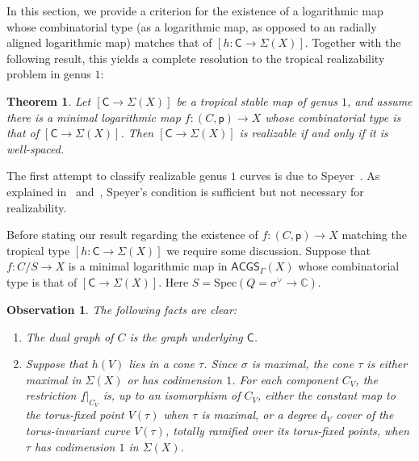 \documentclass{article}
\def\C{\mathbb{C}}
\newtheorem{theorem}[definition]{Theorem}
\newtheorem{observation}[definition]{Observation}
\begin{document}
In this section, we provide a criterion for the existence of a logarithmic map whose combinatorial type (as a logarithmic map, as opposed to an radially aligned logarithmic map) matches that of $[h \colon \mathsf{C} \to \Sigma(X)]$. Together with the following result, this yields a complete resolution to the tropical realizability problem in genus $1$: 

\begin{theorem}\cite[Theorem 4.4.8]{RSWII} \label{thm: rswii}
Let $[\mathsf{C} \to \Sigma(X)]$ be a tropical stable map of genus $1$, and assume there is a minimal logarithmic map $f:(C,\mathsf{p}) \to X$ whose combinatorial type is that of $[\mathsf{C} \to \Sigma(X)]$. Then $[\mathsf{C} \to \Sigma(X)]$ is realizable if and only if it is well-spaced.
\end{theorem}

The first attempt to classify realizable genus $1$ curves is due to Speyer~\cite{Speyer}. As explained in~\cite[Theorem~C]{Ran17} and~\cite[Figure~5]{RSWII}, Speyer’s condition is sufficient but not necessary for realizability.

Before stating our result regarding the existence of $f:(C,\mathsf{p}) \to X$ matching the tropical type $[h \colon \mathsf{C} \to \Sigma(X)]$ we require some discussion. Suppose that $f:C/S \to X$ is a minimal logarithmic map in $\mathsf{ACGS}_{\Gamma}(X)$ whose combinatorial type is that of $[\mathsf{C} \to \Sigma(X)]$. Here $S=\mathrm{Spec}( Q=\sigma^\vee \to \C)$.

\begin{observation}\label{disc:properties-over-sigma}
The following facts are clear:
\begin{enumerate}[label=(\arabic*)]
    \item The dual graph of $C$ is the graph underlying $\mathsf{C}$. 
    
    \item Suppose that $h(V)$ lies in a cone $\tau$. Since $\sigma$ is maximal, the cone $\tau$ is either maximal in $\Sigma(X)$ or has codimension $1$. For each component $C_V$, the restriction $\underline{f}|_{C_V}$ is, up to an isomorphism of $C_V$, either the constant map to the torus-fixed point $V(\tau)$ when $\tau$ is maximal, or a degree $d_V$ cover of the torus-invariant curve $V(\tau)$, totally ramified over its torus-fixed points, when $\tau$ has codimension $1$ in $\Sigma(X)$.
\end{enumerate}
\end{observation}
\end{document}
